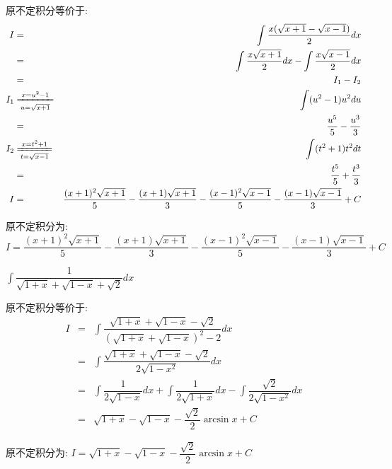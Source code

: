 \begin{solution}
		
	原不定积分等价于:  
	\begin{eqnarray*}
		I&=&\int \dfrac{x(\sqrt{x+1}-\sqrt{x-1})}{2}dx\\
		&=&\int \dfrac{x\sqrt{x+1}}{2}dx-\int \dfrac{x\sqrt{x-1}}{2}dx\\
		&=&I_{1}-I_{2}\\
		I_{1}&\xlongequal[u=\sqrt{x+1}]{x=u^2-1}&\int (u^2-1)u^2du\\
		&=&\dfrac{u^5}{5}-\dfrac{u^3}{3}\\
		I_{2}&\xlongequal[t=\sqrt{x-1}]{x=t^2+1}&\int (t^2+1)t^2dt\\
		&=&\dfrac{t^5}{5}+\dfrac{t^3}{3}\\
		I&=&\dfrac{(x+1)^2\sqrt{x+1}}{5}-\dfrac{(x+1)\sqrt{x+1}}{3}-\dfrac{(x-1)^2\sqrt{x-1}}{5}-\dfrac{(x-1)\sqrt{x-1}}{3}+C
	\end{eqnarray*}
	
	原不定积分为:  $I=\dfrac{(x+1)^2\sqrt{x+1}}{5}-\dfrac{(x+1)\sqrt{x+1}}{3}-\dfrac{(x-1)^2\sqrt{x-1}}{5}-\dfrac{(x-1)\sqrt{x-1}}{3}+C$
\end{solution}

\begin{proposition}
	$\int \dfrac{1}{\sqrt{1+x}+\sqrt{1-x}+\sqrt{2}}dx$
\end{proposition}
\begin{solution}
		
	原不定积分等价于:  
	\begin{eqnarray*}
		I&=&\int \dfrac{\sqrt{1+x}+\sqrt{1-x}-\sqrt{2}}{(\sqrt{1+x}+\sqrt{1-x})^2-2}dx\\
		&=&\int \dfrac{\sqrt{1+x}+\sqrt{1-x}-\sqrt{2}}{2\sqrt{1-x^2}}dx\\
		&=&\int \dfrac{1}{2\sqrt{1-x}}dx+\int \dfrac{1}{2\sqrt{1+x}}dx-\int \dfrac{\sqrt{2}}{2\sqrt{1-x^2}}dx\\
		&=&\sqrt{1+x}-\sqrt{1-x}-\dfrac{\sqrt{2}}{2}\arcsin x+C
	\end{eqnarray*}
	
	原不定积分为:  $I=\sqrt{1+x}-\sqrt{1-x}-\dfrac{\sqrt{2}}{2}\arcsin x+C$
\end{solution}

